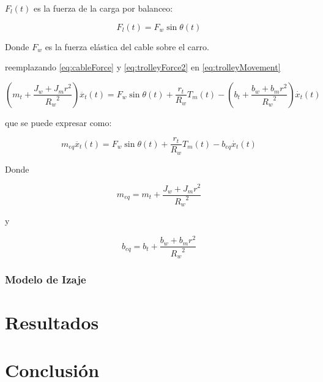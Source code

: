 \documentclass{article}
\begin{document}
            $F_l(t)$ es la fuerza de la carga por balanceo:

            \begin{equation} \label{eq:cableForce}
                F_l(t) = F_w \sin{\theta(t)}
            \end{equation}

            Donde $F_w$ es la fuerza elástica del cable sobre el carro.

            reemplazando \ref{eq:cableForce}  y \ref{eq:trolleyForce2} en \ref{eq:trolleyMovement}


            \begin{equation} \label{eq:mechSSlong}
                (m_t + \frac{J_w + J_m r^2}{{R_w}^2}) \ddot{x_t}(t) = F_w \sin{\theta(t)} +  \frac{r_t}{R_w} T_m(t) - (b_t + \frac{b_w + b_m r^2}{{R_w}^2}) \dot{x_t}(t)
            \end{equation}

            que se puede expresar como:

            \begin{equation} \label{eq:mechSSshort}
                m_{eq} \ddot{x_t}(t) = F_w \sin{\theta(t)} +  \frac{r_t}{R_w} T_m(t) - b_{eq} \dot{x_t}(t)
            \end{equation}

            Donde

            \begin{equation} \label{eq:eqMass}
                m_{eq} = m_t + \frac{J_w + J_m r^2}{{R_w}^2}
            \end{equation}

            y

            \begin{equation} \label{eq:eqDamp}
                b_{eq} = b_t + \frac{b_w + b_m r^2}{{R_w}^2}
            \end{equation}


        \subsubsection{Modelo de Izaje}




\section{Resultados} \label{sec:results}

\section{Conclusión} \label{sec:conclusion}


%

%
\end{document}
